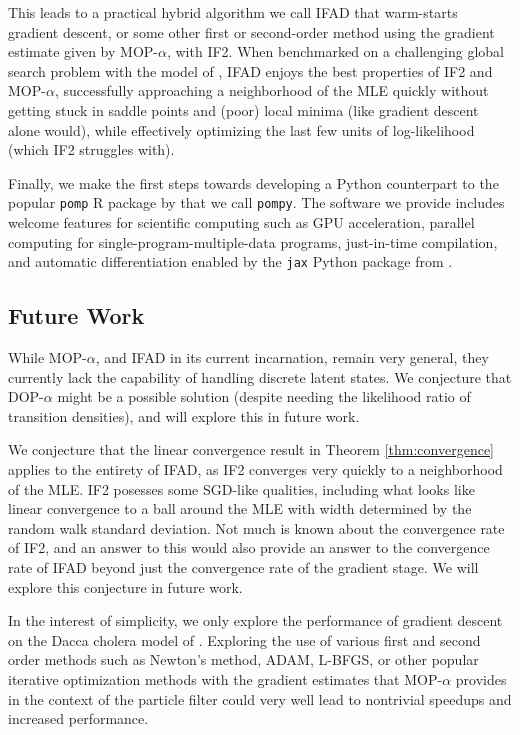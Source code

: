 \documentclass{article}
\begin{document}
This leads to a practical hybrid algorithm we call IFAD that warm-starts gradient descent, or some other first or second-order method using the gradient estimate given by MOP-$\alpha$, with IF2. When benchmarked on a challenging global search problem with the model of \cite{king08}, IFAD enjoys the best properties of IF2 and MOP-$\alpha$, successfully approaching a neighborhood of the MLE quickly without getting stuck in saddle points and (poor) local minima (like gradient descent alone would), while effectively optimizing the last few units of log-likelihood (which IF2 struggles with). 

Finally, we make the first steps towards developing a Python counterpart to the popular \texttt{pomp} R package by \citet{king16, king2017pompmanual} that we call \texttt{pompy}. The software we provide includes welcome features for scientific computing such as GPU acceleration, parallel computing for single-program-multiple-data programs, just-in-time compilation, and automatic differentiation enabled by the \texttt{jax} Python package from \citet{jax2018github}. 


\subsection{Future Work}

While MOP-$\alpha$, and IFAD in its current incarnation, remain very general, they currently lack the capability of handling discrete latent states. We conjecture that DOP-$\alpha$ might be a possible solution (despite needing the likelihood ratio of transition densities), and will explore this in future work.

We conjecture that the linear convergence result in Theorem \ref{thm:convergence} applies to the entirety of IFAD, as IF2 converges very quickly to a neighborhood of the MLE. IF2 posesses some SGD-like qualities, including what looks like linear convergence to a ball around the MLE with width determined by the random walk standard deviation. Not much is known about the convergence rate of IF2, and an answer to this would also provide an answer to the convergence rate of IFAD beyond just the convergence rate of the gradient stage. We will explore this conjecture in future work.

In the interest of simplicity, we only explore the performance of gradient descent on the Dacca cholera model of \cite{king08}. Exploring the use of various first and second order methods such as Newton's method, ADAM, L-BFGS, or other popular iterative optimization methods with the gradient estimates that MOP-$\alpha$ provides in the context of the particle filter could very well lead to nontrivial speedups and increased performance. 
\end{document}
